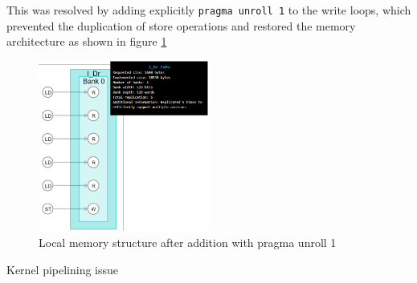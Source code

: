 This was resolved by adding explicitly \texttt{pragma unroll 1} to the
write loops, which prevented the duplication of store operations and
restored the memory architecture as shown in figure \ref{fig:restored}

\begin{figure}[ht]%
    \centering
    \includegraphics[width=0.5\textwidth]{images/fixed_arb}
    \caption{Local memory structure after addition with pragma unroll 1}
    \label{fig:restored}
\end{figure}


Kernel pipelining issue
